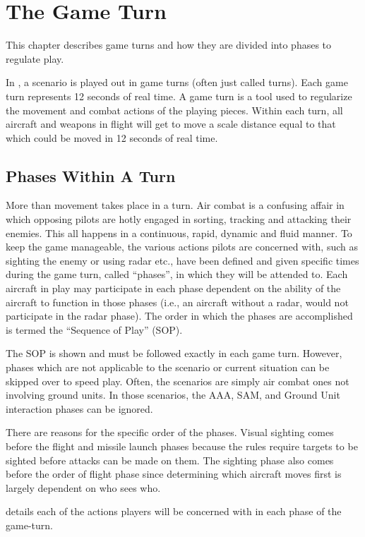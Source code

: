 \chapter
{The Game Turn}

This chapter describes game turns and how they are divided into phases to regulate play.

In {\AirPow}, a scenario is played out in game turns (often just called turns). Each game turn represents 12 seconds of real time.  A game turn is a tool used to regularize the movement and combat actions of the playing pieces. Within each turn, all aircraft and weapons in flight will get to move a scale distance equal to that which could be moved in 12 seconds of real time.

\section
{Phases Within A Turn}

More than movement takes place in a turn. Air combat is a confusing affair in which opposing pilots are hotly engaged in sorting, tracking and attacking their enemies. This all happens in a continuous, rapid, dynamic and fluid manner. To keep the game manageable, the various actions pilots are concerned with, such as sighting the enemy or using radar etc., have been defined and given specific times during the game turn, called “phases”, in which they will be attended to. Each aircraft in play may participate in each phase dependent on the ability of the aircraft to function in those phases (i.e., an aircraft without a radar, would not participate in the radar phase). The order in which the phases are accomplished is termed the “Sequence of Play” (SOP).

The {\AirPow} SOP is shown  and must be followed exactly in each game turn. However, phases which are not applicable to the scenario or current situation can be skipped over to speed play. Often, the scenarios are simply air combat ones not involving ground units. In those scenarios, the AAA, SAM, and Ground Unit interaction phases can be ignored.



There are reasons for the specific order of the phases. Visual sighting comes before the flight and missile launch phases because the rules require targets to be sighted before attacks can be made on them. The sighting phase also comes before the order of flight phase since determining which aircraft moves first is largely dependent on who sees who.


 details each of the actions players will be concerned with in each phase of the game-turn.